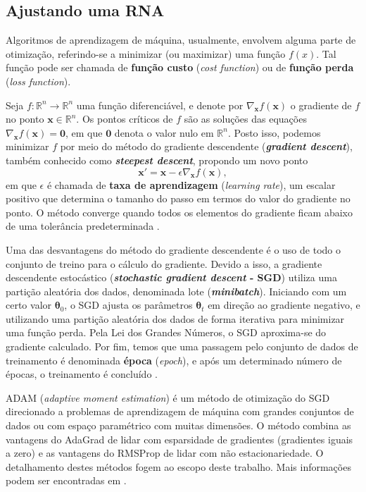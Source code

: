 \documentclass{automatextcc}
\newcommand{\R}{\mathds{R}}
\newcommand{\bs}[1]{\boldsymbol{#1}}
\begin{document}
\subsection{Ajustando uma RNA}
Algoritmos de aprendizagem de máquina, usualmente, envolvem alguma parte de otimização, referindo-se a minimizar (ou maximizar) uma função $f(x)$. Tal função pode ser chamada de \textbf{função custo} (\textit{cost function}) ou de \textbf{função perda} (\textit{loss function}). 


Seja $f: \R^n \rightarrow \R^n$ uma função diferenciável, e denote por $\nabla_{\bs{x}} f(\bs{x})$ o gradiente de $f$ no ponto $\bs{x}\in\R^n$. Os pontos críticos de $f$ são as soluções das equações $\nabla_{\bs{x}} f(\bs{x}) = \bs{0}$, em que $\bs{0}$ denota o valor nulo em $\R^n$. Posto isso, podemos minimizar $f$ por meio do método  do gradiente descendente (\textit{\textbf{gradient descent}}), também conhecido como \textit{\textbf{steepest descent}}, propondo um novo ponto
\begin{equation*}
    \bs{x'} = \bs{x} - \epsilon \nabla_{\bs{x}} f(\bs{x}),
\end{equation*}
em que $\epsilon$ é chamada de \textbf{taxa de aprendizagem} (\textit{learning rate}), um escalar positivo que determina o tamanho do passo em termos do valor do gradiente no ponto. O método converge quando todos os elementos do gradiente ficam abaixo de uma tolerância predeterminada \citep{goodfellow2016}. 

Uma das desvantagens  do método do gradiente descendente é o uso de todo o conjunto de treino para o cálculo do gradiente. Devido a isso, a  gradiente descendente estocástico (\textbf{\textit{stochastic gradient descent} - SGD}) utiliza uma partição aleatória dos dados, denominada lote (\textbf{\textit{minibatch}}). Iniciando com um certo valor $\bs{\theta}_0$, o SGD ajusta os parâmetros $\bs{\theta}_t$ em direção ao gradiente negativo, e utilizando uma partição aleatória dos dados de forma iterativa para minimizar uma função perda. Pela Lei dos Grandes Números, o SGD aproxima-se do gradiente calculado. Por fim, temos que uma passagem pelo conjunto de dados de treinamento é denominada \textbf{época} (\textit{epoch}), e após um determinado número de épocas, o treinamento é concluído \citep{goodfellow2016, kamath2019, fan2021}. 

ADAM (\textit{adaptive moment estimation}) é um método de otimização do SGD direcionado a problemas de aprendizagem de máquina com grandes conjuntos de dados ou com espaço paramétrico com muitas dimensões. O método combina as vantagens do AdaGrad \citep{duchi2011} de lidar com esparsidade de gradientes (gradientes iguais a zero) e as vantagens do RMSProp \citep{tieleman2012} de lidar com não estacionariedade. O detalhamento destes métodos fogem ao escopo deste trabalho. Mais informações podem ser encontradas em \citet{kingma2014}.
\end{document}
